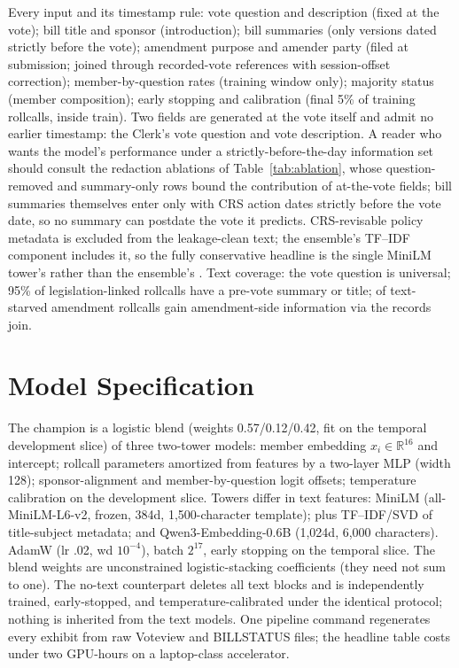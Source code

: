 \documentclass[12pt]{article}
\begin{document}
Every input and its timestamp rule: vote question and description
(fixed at the vote); bill title and sponsor (introduction); bill
summaries (only versions dated strictly before the vote); amendment
purpose and amender party (filed at submission; joined through
recorded-vote references with session-offset correction);
member-by-question rates (training window only); majority status
(member composition); early stopping and calibration (final 5\% of
training rollcalls, inside train). Two fields are generated at the
vote itself and admit no earlier timestamp: the Clerk's vote question
and vote description. A reader who wants the model's performance
under a strictly-before-the-day information set should consult the
redaction ablations of Table~\ref{tab:ablation}, whose
question-removed and summary-only rows bound the contribution of
at-the-vote fields; bill summaries themselves enter only with CRS
action dates strictly before the vote date, so no summary can
postdate the vote it predicts. CRS-revisable policy metadata is
excluded from the leakage-clean text; the ensemble's TF--IDF
component includes it, so the fully conservative headline is the
single MiniLM tower's \incForecastLL{} rather than the ensemble's
\champForecastLL. Text coverage: the vote question is universal; 95\%
of legislation-linked rollcalls have a pre-vote summary or title;
\amdtFilledNoDesc{} of \amdtNoDesc{} text-starved amendment rollcalls
gain amendment-side information via the records join.

\section{Model Specification}
\label{app:spec}

The champion is a logistic blend (weights 0.57/0.12/0.42, fit on the
temporal development slice) of three two-tower models: member
embedding $x_i \in \mathbb{R}^{16}$ and intercept; rollcall
parameters amortized from features by a two-layer MLP (width 128);
sponsor-alignment and member-by-question logit offsets; temperature
calibration on the development slice. Towers differ in text features:
MiniLM (all-MiniLM-L6-v2, frozen, 384d, 1,500-character template);
plus TF--IDF/SVD of title-subject metadata; and Qwen3-Embedding-0.6B
(1,024d, 6,000 characters). AdamW (lr .02, wd $10^{-4}$), batch
$2^{17}$, early stopping on the temporal slice. The blend weights are
unconstrained logistic-stacking coefficients (they need not sum to
one). The no-text counterpart deletes all text blocks and is
independently trained, early-stopped, and temperature-calibrated
under the identical protocol; nothing is inherited from the text
models. One
pipeline command regenerates every exhibit from raw Voteview and
BILLSTATUS files; the headline table costs under two GPU-hours on a
laptop-class accelerator.
\end{document}
